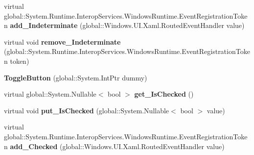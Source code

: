 \begin{DoxyCompactItemize}
\item 
\mbox{\label{class_windows_1_1_u_i_1_1_xaml_1_1_controls_1_1_primitives_1_1_toggle_button_a1f1913eba8709563eba2ffc6ada7b337}} 
virtual global\+::\+System.\+Runtime.\+Interop\+Services.\+Windows\+Runtime.\+Event\+Registration\+Token {\bfseries add\+\_\+\+Indeterminate} (global\+::\+Windows.\+U\+I.\+Xaml.\+Routed\+Event\+Handler value)
\item 
\mbox{\label{class_windows_1_1_u_i_1_1_xaml_1_1_controls_1_1_primitives_1_1_toggle_button_af20454c3f1b1b6b81eb8483851df5397}} 
virtual void {\bfseries remove\+\_\+\+Indeterminate} (global\+::\+System.\+Runtime.\+Interop\+Services.\+Windows\+Runtime.\+Event\+Registration\+Token token)
\item 
\mbox{\label{class_windows_1_1_u_i_1_1_xaml_1_1_controls_1_1_primitives_1_1_toggle_button_a49287addc0d795495badcb684663bfbb}} 
{\bfseries Toggle\+Button} (global\+::\+System.\+Int\+Ptr dummy)
\item 
\mbox{\label{class_windows_1_1_u_i_1_1_xaml_1_1_controls_1_1_primitives_1_1_toggle_button_a202ddd3b271346dd0243b775278794c4}} 
virtual global\+::\+System.\+Nullable$<$ bool $>$ {\bfseries get\+\_\+\+Is\+Checked} ()
\item 
\mbox{\label{class_windows_1_1_u_i_1_1_xaml_1_1_controls_1_1_primitives_1_1_toggle_button_ac698bb4aa4d35725eb48fe2b35f4e0f8}} 
virtual void {\bfseries put\+\_\+\+Is\+Checked} (global\+::\+System.\+Nullable$<$ bool $>$ value)
\item 
\mbox{\label{class_windows_1_1_u_i_1_1_xaml_1_1_controls_1_1_primitives_1_1_toggle_button_a55fb908f07af09c5b2cbf2a26bb63503}} 
virtual global\+::\+System.\+Runtime.\+Interop\+Services.\+Windows\+Runtime.\+Event\+Registration\+Token {\bfseries add\+\_\+\+Checked} (global\+::\+Windows.\+U\+I.\+Xaml.\+Routed\+Event\+Handler value)

\end{DoxyCompactItemize}

